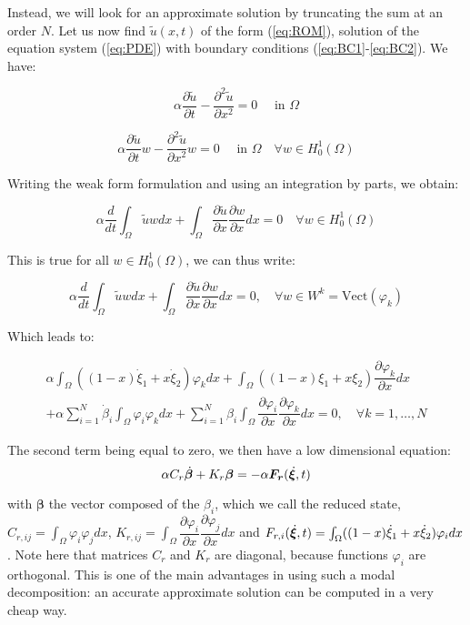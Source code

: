 Instead, we will look for an approximate solution by truncating the sum at
an order $N$.
Let us now find $\tilde u(x,t)$ of the form (\ref{eq:ROM}), solution 
of the equation system (\ref{eq:PDE}) with boundary conditions (\ref{eq:BC1}-\ref{eq:BC2}).
We have:

$$ \alpha \dfrac{\partial \tilde u}{ \partial t} -  \dfrac{\partial^2 \tilde u}{ \partial x^2} = 0 \quad\mbox{ in } \Omega $$

$$ \alpha \dfrac{\partial \tilde u}{ \partial t} w -  \dfrac{\partial^2 \tilde u}{ \partial x^2}w = 0  \quad\mbox{ in } \Omega \quad \forall w \in H^1_0(\Omega)$$

Writing the weak form formulation and using an integration by parts, we obtain:

$$ \alpha \dfrac{d}{dt} \int_\Omega \tilde u w dx + \int_\Omega \dfrac{\partial \tilde u}{\partial x} \dfrac{\partial w}{\partial x} dx = 0 \quad \forall w \in H_0^1(\Omega) $$

This is true for all $w \in H_0^1(\Omega)$, we can thus write:

$$\displaystyle{ \alpha \dfrac{d}{dt} \int_\Omega \tilde u w dx + \int_\Omega \dfrac{\partial \tilde u}{\partial x} \dfrac{\partial w}{\partial x} dx =0, \quad \forall w \in W^k = \text{Vect}(\varphi_k)}$$

Which leads to:

 \begin{multline*}
 \displaystyle{ \alpha \int_\Omega ((1-x) \dot \xi_1 + x \dot \xi_2) \varphi_k dx + \int_\Omega ((1-x) \xi_1 + x \xi_2) \dfrac{\partial \varphi_k}{\partial x} dx } \\ 
 \displaystyle{+ \alpha \sum_{i=1}^N \dot \beta_i \int_\Omega \varphi_i \varphi_k dx + \sum_{i=1}^N \beta_i \int_\Omega \dfrac{ \partial \varphi_i}{\partial x} \dfrac{ \partial \varphi_k}{\partial x} dx = 0, \quad \forall k = 1,\dots,N}
 \end{multline*}

\vspace{1em}

The second term being equal to zero, we then have a low dimensional equation:
\begin{equation}
 \alpha C_r \dot{\bm{\beta}} + K_r \bm{\beta} = - \alpha \bm{F_r}(\dot{\bm{\xi}},t)
 \label{eq:red}
\end{equation}

with $\bm{\beta}$ the vector composed of the $\beta_i$, which we call 
the reduced state, $C_{r,ij} = \int_\Omega  \varphi_i \varphi_j dx$, $K_{r,ij} = \int_\Omega  \dfrac{ \partial \varphi_i}{\partial x} \dfrac{ \partial \varphi_j}{\partial x} dx$
and ${F_{r,i}}(\dot{\bm{\xi}},t) = \int_\Omega ((1-x) \dot \xi_1 + x \dot \xi_2) \varphi_i dx$.
Note here that matrices $C_r$ and $K_r$ are diagonal, because functions $\varphi_i$
are orthogonal. This is one of the main advantages
in using such a modal decomposition: an accurate approximate solution
can be computed in a very cheap way.

